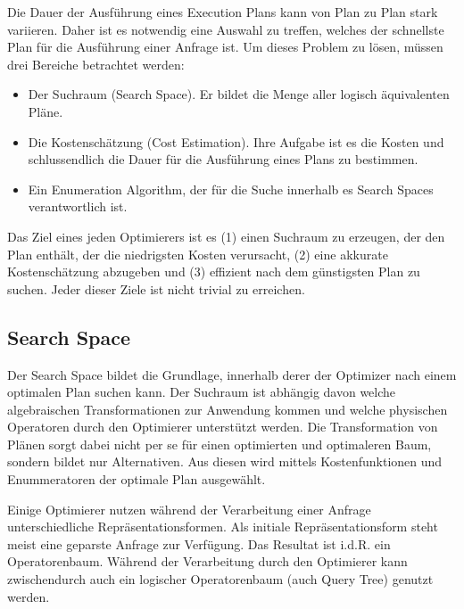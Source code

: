 Die Dauer der Ausführung eines Execution Plans kann von Plan zu Plan stark variieren. Daher ist es notwendig eine Auswahl zu treffen, welches der schnellste Plan für die Ausführung einer Anfrage ist. Um dieses Problem zu lösen, müssen drei Bereiche betrachtet werden:

\begin{itemize}
\item Der Suchraum (Search Space). Er bildet die Menge aller logisch äquivalenten Pläne.
\item Die Kostenschätzung (Cost Estimation). Ihre Aufgabe ist es die Kosten und schlussendlich die Dauer für die Ausführung eines Plans zu bestimmen.
\item Ein Enumeration Algorithm, der für die Suche innerhalb es Search Spaces verantwortlich ist.
\end{itemize}

Das Ziel eines jeden Optimierers ist es (1) einen Suchraum zu erzeugen, der den Plan enthält, der die niedrigsten Kosten verursacht, (2) eine akkurate Kostenschätzung abzugeben und (3) effizient nach dem günstigsten Plan zu suchen. Jeder dieser Ziele ist nicht trivial zu erreichen.



\subsection{Search Space}

Der Search Space bildet die Grundlage, innerhalb derer der Optimizer nach einem optimalen Plan suchen kann. Der Suchraum ist abhängig davon welche algebraischen Transformationen zur Anwendung kommen und welche physischen Operatoren durch den Optimierer unterstützt werden. Die Transformation von Plänen sorgt dabei nicht per se für einen optimierten und optimaleren Baum, sondern bildet nur Alternativen. Aus diesen wird mittels Kostenfunktionen und Enummeratoren der optimale Plan ausgewählt.

Einige Optimierer nutzen während der Verarbeitung einer Anfrage unterschiedliche Repräsentationsformen. Als initiale Repräsentationsform steht meist eine geparste Anfrage zur Verfügung. Das Resultat ist i.d.R. ein Operatorenbaum. Während der Verarbeitung durch den Optimierer kann zwischendurch auch ein logischer Operatorenbaum (auch Query Tree) genutzt werden.

